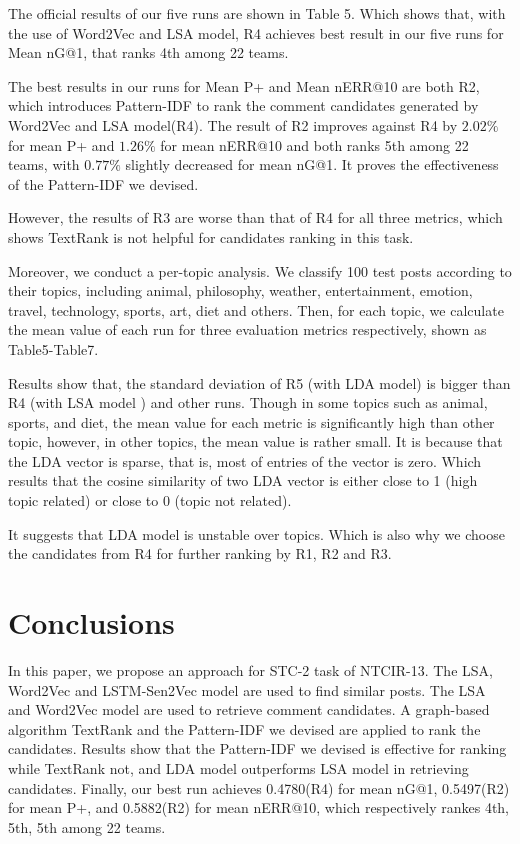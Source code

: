 \documentclass{sig-alternate}
\begin{document}
The official results of our five runs are shown in Table 5. Which shows 
that, with the use of Word2Vec and LSA model, R4 achieves 
best result in our five runs for Mean nG@1, that ranks 4th among 22 teams. 

The best results in our runs for Mean P+ and Mean nERR@10 are both R2, 
which introduces Pattern-IDF to rank the comment candidates generated by 
Word2Vec and LSA model(R4). The result of R2 improves against R4 by $2.02\%$ for mean P+ and $1.26\%$ for mean nERR@10 and both ranks 5th among 22 teams, with $0.77\%$ slightly decreased for mean nG@1. It proves the 
effectiveness of the Pattern-IDF we devised. 

However, the results of R3 are worse than that of R4 for all three metrics, 
which shows TextRank is not helpful for candidates ranking in this task.


Moreover, we conduct a per-topic analysis. We classify 100 test posts according to their topics, including animal, philosophy, weather, entertainment, emotion, travel, technology, sports, art, diet and others. Then, for each topic, we calculate the mean value of each run for three evaluation metrics respectively, shown as Table5-Table7. 

Results show that, the standard deviation of R5 (with LDA model) is bigger than R4 (with LSA model ) and other runs.  
Though in some topics such as animal, sports, and diet, the 
mean value for each metric is significantly high than other topic, however, in other topics, the mean value is rather small. It is because that the LDA vector is sparse, that is, most of entries of the vector is zero. Which results that the cosine similarity of two LDA vector is either close to 1 (high topic related) or close to 0 (topic not related).

It suggests that LDA model is unstable over topics. Which is also why we choose the candidates from R4 for further ranking by R1, R2 and R3.  



\section{Conclusions}
In this paper, we propose an approach for STC-2 task of NTCIR-13. The LSA,
Word2Vec and LSTM-Sen2Vec model are used to find similar posts. The LSA and Word2Vec 
model are used to retrieve comment candidates. A graph-based algorithm TextRank 
and the Pattern-IDF we devised are applied to rank the candidates. Results show 
that the Pattern-IDF we devised is effective for ranking while TextRank not, 
and LDA model outperforms LSA model in retrieving candidates. Finally, our best 
run achieves 0.4780(R4) for mean nG@1, 0.5497(R2) for mean P+, and 0.5882(R2) for 
mean nERR@10, which respectively rankes 4th, 5th, 5th among 22 teams. 
\end{document}
